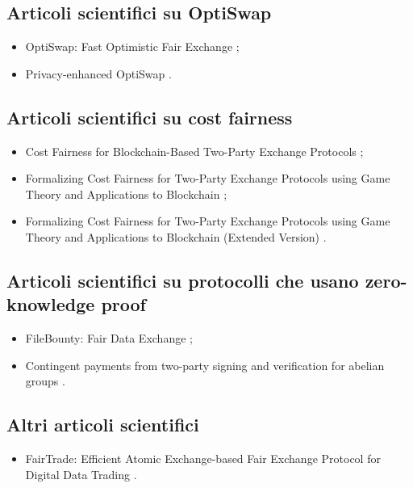 \subsection*{Articoli scientifici su OptiSwap}
\begin{itemize}

\item OptiSwap: Fast Optimistic Fair Exchange \cite{eckey2020optiswap};

\item Privacy-enhanced OptiSwap \cite{avizheh2021optiswap}.

\end{itemize}

\subsection*{Articoli scientifici su cost fairness}
\begin{itemize}

\item Cost Fairness for Blockchain-Based Two-Party Exchange Protocols \cite{lhor2020costfairness};

\item Formalizing Cost Fairness for Two-Party Exchange Protocols using Game Theory and Applications to Blockchain \cite{lhor2022costfairness};

\item Formalizing Cost Fairness for Two-Party Exchange Protocols using Game Theory and Applications to Blockchain (Extended Version) \cite{lhor2022costfairnessext}.

\end{itemize}

\subsection*{Articoli scientifici su protocolli che usano zero-knowledge proof}
\begin{itemize}

\item FileBounty: Fair Data Exchange \cite{janin2020fairdata};

\item Contingent payments from two-party signing and verification for abelian groups \cite{bursuc2022fairabelian}.

\end{itemize}

\subsection*{Altri articoli scientifici}
\begin{itemize}

\item FairTrade: Efficient Atomic Exchange-based Fair Exchange Protocol for Digital Data Trading \cite{chenli2021fairtrade}.

\end{itemize}

